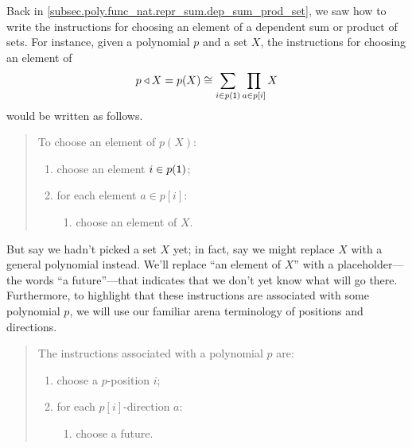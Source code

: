 \documentclass[Book-Poly]{subfiles}
\begin{document}
Back in \cref{subsec.poly.func_nat.repr_sum.dep_sum_prod_set}, we saw how to write the instructions for choosing an element of a dependent sum or product of sets.
For instance, given a polynomial $p$ and a set $X$, the instructions for choosing an element of
\[
    p\mathbin{\triangleleft} X=p(X)\cong\sum_{i\in p(\textsf{1})}\prod_{a\in p[i]}X
\]
would be written as follows.
\begin{quote}
To choose an element of $p(X)$: 
\begin{enumerate}
    \item choose an element $i\in p(\textsf{1})$;
    \item for each element $a\in p[i]$:
    \begin{enumerate}[label*=\arabic*.]
        \item choose an element of $X$.
    \end{enumerate}
\end{enumerate}
\end{quote}
But say we hadn't picked a set $X$ yet; in fact, say we might replace $X$ with a general polynomial instead.
We'll replace ``an element of $X$'' with a placeholder---the words ``a future''---that indicates that we don't yet know what will go there.
Furthermore, to highlight that these instructions are associated with some polynomial $p$, we will use our familiar arena terminology of positions and directions.
\begin{quote}
The instructions associated with a polynomial $p$ are:
\begin{enumerate}
    \item choose a $p$-position $i$;
    \item for each $p[i]$-direction $a$:
    \begin{enumerate}[label*=\arabic*.]
        \item choose a future.
    \end{enumerate}
\end{enumerate}
\end{quote}
\end{document}
